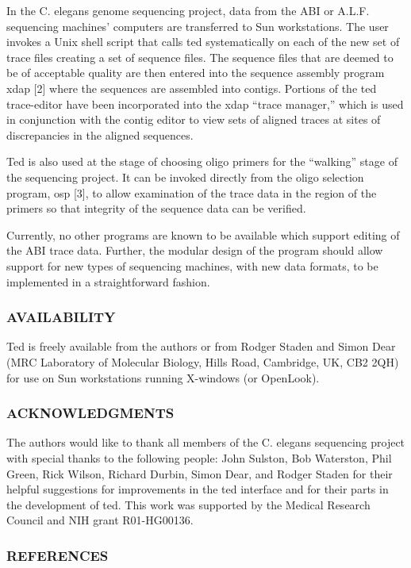 	In the C. elegans genome sequencing project, data from the ABI or 
A.L.F. sequencing machines' computers are transferred to Sun 
workstations.  
The user invokes a Unix shell script that calls ted systematically 
on each of the new set of trace files creating a set of sequence files.
The sequence files that are deemed to be of acceptable quality
are then entered into the sequence 
assembly program xdap [2] where the sequences are assembled into 
contigs.  Portions of the ted trace-editor have been incorporated 
into the xdap ``trace manager,''  which is used in 
conjunction with the contig editor to view sets of aligned traces 
at sites of discrepancies in the aligned sequences.  

	Ted is also used at the stage of choosing oligo primers for the 
``walking'' stage of the sequencing project.  It can be invoked directly 
from the oligo selection program, osp [3], to allow examination
of the trace data in the region of the primers so that  
integrity of the sequence data can be verified.

	Currently, no other programs are known to be available 
which support editing of the ABI trace data. 
Further, the modular design of the program should allow
support for new types of sequencing machines, with new data 
formats, to be implemented in a straightforward fashion.  


\subsubsection*{AVAILABILITY}
	Ted is freely available from the authors or from Rodger Staden and
Simon Dear (MRC Laboratory of Molecular Biology, Hills Road, Cambridge,
UK, CB2 2QH) for use on Sun workstations running X-windows (or OpenLook).


\subsubsection*{ACKNOWLEDGMENTS}
	The authors would like to thank all members of the C. elegans
sequencing project with special thanks to the following people:
John Sulston, Bob Waterston,  
Phil Green, Rick Wilson, Richard Durbin, Simon Dear, and Rodger Staden 
for their helpful suggestions for improvements in the ted interface 
and for their parts in the development of ted.  This work was 
supported by the Medical Research Council and NIH grant R01-HG00136.

\subsubsection*{REFERENCES}

